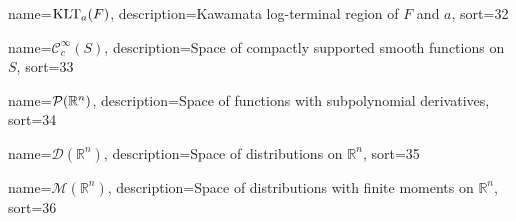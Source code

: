 {
  name={\ensuremath{\KLT_a(F)}},
  description={Kawamata log-terminal region of $F$ and $a$},
  sort=32
}

{
  name={\ensuremath{\mathcal{C}_c^\infty(S)}},
  description={Space of compactly supported smooth functions on $S$},
  sort=33
}


{
  name={\ensuremath{\mathcal{P}(\R^n)}},
  description={Space of functions with subpolynomial derivatives},
  sort=34
}


{
  name={\ensuremath{\mathcal{D}(\mathbb{R}^n)}},
  description={Space of distributions on $\mathbb{R}^n$},
  sort=35
}


{
  name={\ensuremath{\mathcal{M}(\mathbb{R}^n)}},
  description={Space of distributions with finite moments on $\mathbb{R}^n$},
  sort=36
}


